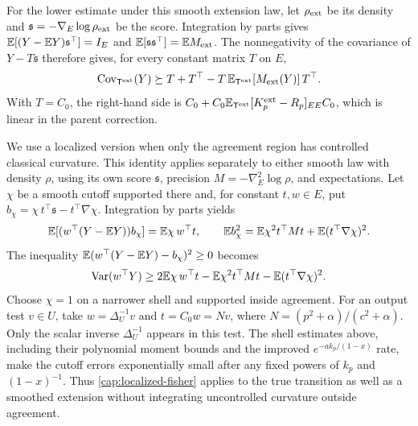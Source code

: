 For the lower estimate under this smooth extension law, let
\(\rho_{\rm ext}\) be its density and
\(\mathfrak s=-\nabla_E\log\rho_{\rm ext}\) be the
score. Integration by parts gives
\(\mathbb E[(Y-\mathbb E Y)\mathfrak s^\top]=I_E\) and
\(\mathbb E[\mathfrak s\mathfrak s^\top]=\mathbb E M_{\rm ext}\). The nonnegativity of the covariance
of \(Y-T\mathfrak s\) therefore gives, for every constant matrix \(T\) on \(E\),
\begin{equation}\label{cap:fisher-variational}
 \operatorname{Cov}_{\mathsf T^{\rm ext}}(Y)
 \succeq T+T^\top-T\,\mathbb E_{\mathsf T^{\rm ext}}[M_{\rm ext}(Y)]\,T^\top.
\end{equation}
With \(T=C_0\), the right-hand side is
\(C_0+C_0\mathbb E_{\mathsf T^{\rm ext}}[K_p^{\rm ext}-R_p]_{EE}C_0\), which is linear in the
parent correction.

We use a localized version when only the agreement region has controlled
classical curvature. This identity applies separately to either smooth
law with density \(\rho\), using its own score \(\mathfrak s\), precision
\(M=-\nabla_E^2\log\rho\), and expectations. Let \(\chi\) be a smooth cutoff supported there and,
for constant \(t,w\in E\), put
\(b_\chi=\chi\,t^\top\mathfrak s-t^\top\nabla\chi\).
Integration by parts yields
\[
 \mathbb E[(w^\top(Y-\mathbb E Y))b_\chi]=\mathbb E\chi\,w^\top t,\qquad
 \mathbb E b_\chi^2=\mathbb E\chi^2 t^\top M t+\mathbb E(t^\top\nabla\chi)^2.
\]
The inequality \(\mathbb E(w^\top(Y-\mathbb E Y)-b_\chi)^2\ge0\) becomes
\begin{equation}\label{cap:localized-fisher}
 \operatorname{Var}(w^\top Y)
 \ge2\mathbb E\chi\,w^\top t-\mathbb E\chi^2t^\top Mt
                       -\mathbb E(t^\top\nabla\chi)^2 .
\end{equation}
Choose \(\chi=1\) on a narrower shell and supported inside agreement.
For an output test \(v\in U\), take \(w=\Delta_U^{-1}v\) and
\(t=C_0w=Nv\), where
\(N=(p^2+\alpha)/(c^2+\alpha)\). Only the scalar inverse \(\Delta_U^{-1}\)
appears in this test. The shell estimates above, including their polynomial
moment bounds and the improved \(e^{-a k_p/(1-x)}\) rate, make the cutoff
errors exponentially small after any fixed powers of \(k_p\) and
\((1-x)^{-1}\). Thus \eqref{cap:localized-fisher} applies to the true
transition as well as a smoothed extension without integrating uncontrolled
curvature outside agreement.

